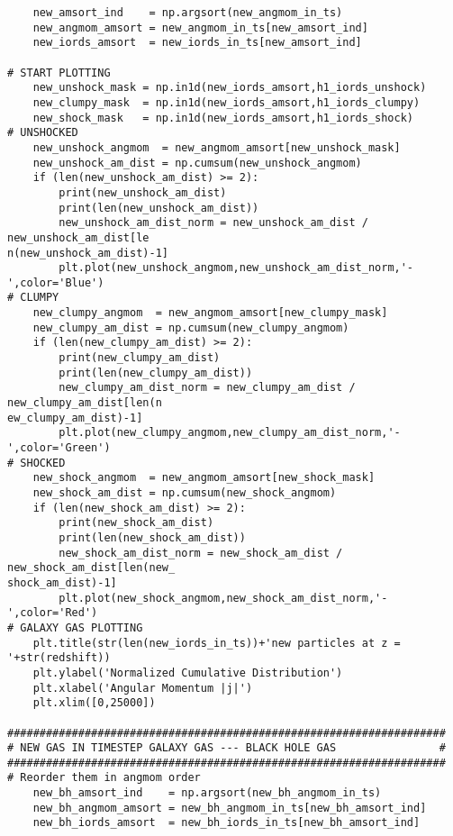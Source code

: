 \documentclass[12pt,headA,chapB]{fiskthesis}
\begin{document}
\begin{verbatim}
    new_amsort_ind    = np.argsort(new_angmom_in_ts)
    new_angmom_amsort = new_angmom_in_ts[new_amsort_ind]
    new_iords_amsort  = new_iords_in_ts[new_amsort_ind]

# START PLOTTING
    new_unshock_mask = np.in1d(new_iords_amsort,h1_iords_unshock)
    new_clumpy_mask  = np.in1d(new_iords_amsort,h1_iords_clumpy)
    new_shock_mask   = np.in1d(new_iords_amsort,h1_iords_shock)
# UNSHOCKED
    new_unshock_angmom  = new_angmom_amsort[new_unshock_mask]
    new_unshock_am_dist = np.cumsum(new_unshock_angmom)
    if (len(new_unshock_am_dist) >= 2):
        print(new_unshock_am_dist)
        print(len(new_unshock_am_dist))
        new_unshock_am_dist_norm = new_unshock_am_dist / new_unshock_am_dist[le
n(new_unshock_am_dist)-1]
        plt.plot(new_unshock_angmom,new_unshock_am_dist_norm,'-',color='Blue')
# CLUMPY
    new_clumpy_angmom  = new_angmom_amsort[new_clumpy_mask]
    new_clumpy_am_dist = np.cumsum(new_clumpy_angmom)  
    if (len(new_clumpy_am_dist) >= 2):
        print(new_clumpy_am_dist)
        print(len(new_clumpy_am_dist))
        new_clumpy_am_dist_norm = new_clumpy_am_dist / new_clumpy_am_dist[len(n
ew_clumpy_am_dist)-1]
        plt.plot(new_clumpy_angmom,new_clumpy_am_dist_norm,'-',color='Green')
# SHOCKED    
    new_shock_angmom  = new_angmom_amsort[new_shock_mask]
    new_shock_am_dist = np.cumsum(new_shock_angmom)
    if (len(new_shock_am_dist) >= 2):
        print(new_shock_am_dist)
        print(len(new_shock_am_dist))
        new_shock_am_dist_norm = new_shock_am_dist / new_shock_am_dist[len(new_
shock_am_dist)-1]
        plt.plot(new_shock_angmom,new_shock_am_dist_norm,'-',color='Red')
# GALAXY GAS PLOTTING
    plt.title(str(len(new_iords_in_ts))+'new particles at z = '+str(redshift))
    plt.ylabel('Normalized Cumulative Distribution')
    plt.xlabel('Angular Momentum |j|')
    plt.xlim([0,25000])

####################################################################
# NEW GAS IN TIMESTEP GALAXY GAS --- BLACK HOLE GAS                #
####################################################################
# Reorder them in angmom order
    new_bh_amsort_ind    = np.argsort(new_bh_angmom_in_ts)
    new_bh_angmom_amsort = new_bh_angmom_in_ts[new_bh_amsort_ind]
    new_bh_iords_amsort  = new_bh_iords_in_ts[new_bh_amsort_ind]


\end{verbatim}
\end{document}
